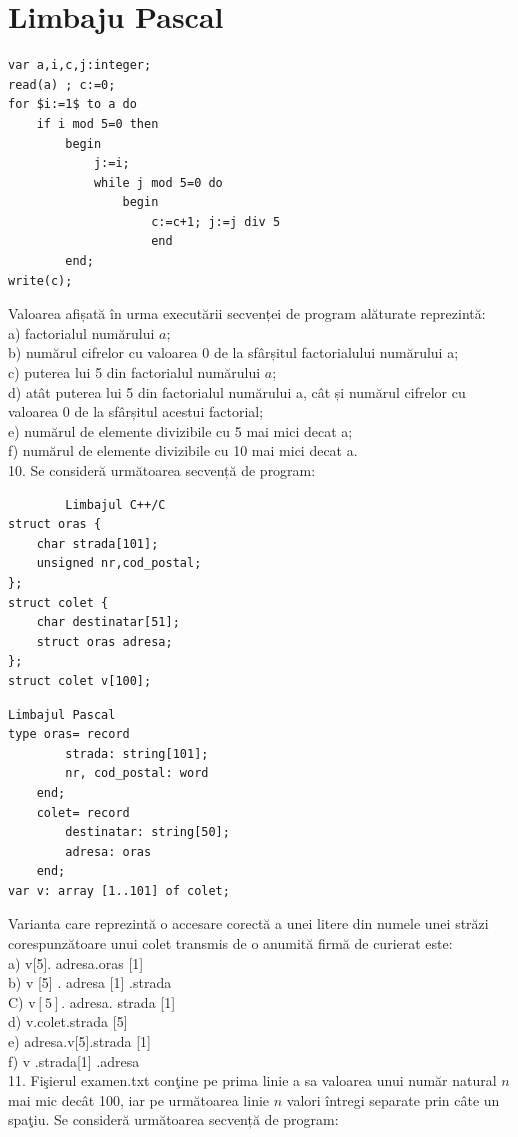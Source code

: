 \documentclass[10pt]{article}
\begin{document}
\section*{Limbaju Pascal}
\begin{verbatim}
var a,i,c,j:integer;
read(a) ; c:=0;
for $i:=1$ to a do
    if i mod 5=0 then
        begin
            j:=i;
            while j mod 5=0 do
                begin
                    c:=c+1; j:=j div 5
                    end
        end;
write(c);
\end{verbatim}

Valoarea afișată în urma executării secvenței de program alăturate reprezintă:\\
a) factorialul numărului $a$;\\
b) numărul cifrelor cu valoarea 0 de la sfârșitul factorialului numărului a;\\
c) puterea lui 5 din factorialul numărului $a$;\\
d) atât puterea lui 5 din factorialul numărului a, cât și numărul cifrelor cu valoarea 0 de la sfârșitul acestui factorial;\\
e) numărul de elemente divizibile cu 5 mai mici decat a;\\
f) numărul de elemente divizibile cu 10 mai mici decat a.\\
10. Se consideră următoarea secvență de program:

\begin{verbatim}
        Limbajul C++/C
struct oras {
    char strada[101];
    unsigned nr,cod_postal;
};
struct colet {
    char destinatar[51];
    struct oras adresa;
};
struct colet v[100];
\end{verbatim}

\begin{verbatim}
Limbajul Pascal
type oras= record
        strada: string[101];
        nr, cod_postal: word
    end;
    colet= record
        destinatar: string[50];
        adresa: oras
    end;
var v: array [1..101] of colet;
\end{verbatim}

Varianta care reprezintă o accesare corectă a unei litere din numele unei străzi corespunzătoare unui colet transmis de o anumită firmă de curierat este:\\[0pt]
a) v[5]. adresa.oras [1]\\[0pt]
b) v [5] . adresa [1] .strada\\
C) $\mathrm{v}[5]$. adresa. strada [1]\\[0pt]
d) v.colet.strada [5]\\[0pt]
e) adresa.v[5].strada [1]\\[0pt]
f) v .strada[1] .adresa\\
11. Fişierul examen.txt conţine pe prima linie a sa valoarea unui număr natural $n$ mai mic decât 100, iar pe următoarea linie $n$ valori întregi separate prin câte un spaţiu. Se consideră următoarea secvență de program:
\end{document}

